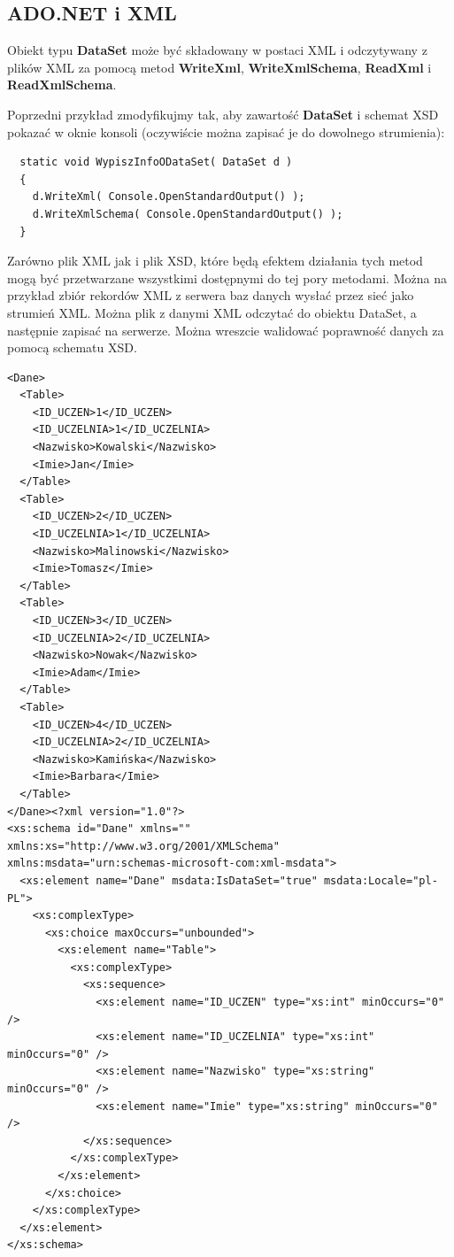 \subsection{ADO.NET i XML}

Obiekt typu {\bf DataSet} może być składowany w postaci XML i odczytywany z plików XML za pomocą
metod {\bf WriteXml}, {\bf WriteXmlSchema}, {\bf ReadXml} i {\bf ReadXmlSchema}.

Poprzedni przykład zmodyfikujmy tak, aby zawartość {\bf DataSet} i schemat XSD pokazać w oknie konsoli
(oczywiście można zapisać je do dowolnego strumienia):

\begin{scriptsize}
\begin{verbatim}
  static void WypiszInfoODataSet( DataSet d )
  {
    d.WriteXml( Console.OpenStandardOutput() );
    d.WriteXmlSchema( Console.OpenStandardOutput() );
  }
\end{verbatim}
\end{scriptsize}

Zarówno plik XML jak i plik XSD, które będą efektem działania tych metod mogą być przetwarzane
wszystkimi dostępnymi do tej pory metodami. Można na przykład zbiór rekordów XML z serwera baz 
danych wysłać przez sieć jako strumień XML. Można plik z danymi XML odczytać do obiektu DataSet,
a następnie zapisać na serwerze. Można wreszcie walidować poprawność danych za pomocą schematu XSD.

\begin{scriptsize}
\begin{verbatim}
<Dane>
  <Table>
    <ID_UCZEN>1</ID_UCZEN>
    <ID_UCZELNIA>1</ID_UCZELNIA>
    <Nazwisko>Kowalski</Nazwisko>
    <Imie>Jan</Imie>
  </Table>
  <Table>
    <ID_UCZEN>2</ID_UCZEN>
    <ID_UCZELNIA>1</ID_UCZELNIA>
    <Nazwisko>Malinowski</Nazwisko>
    <Imie>Tomasz</Imie>
  </Table>
  <Table>
    <ID_UCZEN>3</ID_UCZEN>
    <ID_UCZELNIA>2</ID_UCZELNIA>
    <Nazwisko>Nowak</Nazwisko>
    <Imie>Adam</Imie>
  </Table>
  <Table>
    <ID_UCZEN>4</ID_UCZEN>
    <ID_UCZELNIA>2</ID_UCZELNIA>
    <Nazwisko>Kamińska</Nazwisko>
    <Imie>Barbara</Imie>
  </Table>
</Dane><?xml version="1.0"?>
<xs:schema id="Dane" xmlns="" xmlns:xs="http://www.w3.org/2001/XMLSchema" 
xmlns:msdata="urn:schemas-microsoft-com:xml-msdata">
  <xs:element name="Dane" msdata:IsDataSet="true" msdata:Locale="pl-PL">
    <xs:complexType>
      <xs:choice maxOccurs="unbounded">
        <xs:element name="Table">
          <xs:complexType>
            <xs:sequence>
              <xs:element name="ID_UCZEN" type="xs:int" minOccurs="0" />
              <xs:element name="ID_UCZELNIA" type="xs:int" minOccurs="0" />
              <xs:element name="Nazwisko" type="xs:string" minOccurs="0" />
              <xs:element name="Imie" type="xs:string" minOccurs="0" />
            </xs:sequence>
          </xs:complexType>
        </xs:element>
      </xs:choice>
    </xs:complexType>
  </xs:element>
</xs:schema>
\end{verbatim}
\end{scriptsize}

